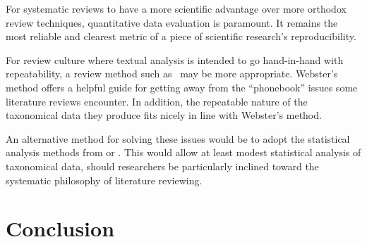 For systematic reviews to have a more scientific advantage over more orthodox review techniques, quantitative data evaluation is paramount. It remains the most reliable and clearest metric of a piece of scientific research's reproducibility.\par

For review culture where textual analysis is intended to go hand-in-hand with repeatability, a review method such as~\cite{Webster2002} may be more appropriate. Webster's method offers a helpful guide for getting away from the ``phonebook'' issues some literature reviews encounter. In addition, the repeatable nature of the taxonomical data they produce fits nicely in line with Webster's method.\par

An alternative method for solving these issues would be to adopt the statistical analysis methods from \cite{Kitchenham2013} or \cite{Chen2007}. This would allow at least modest statistical analysis of taxonomical data, should researchers be particularly inclined toward the systematic philosophy of literature reviewing.\par


\section{Conclusion}








